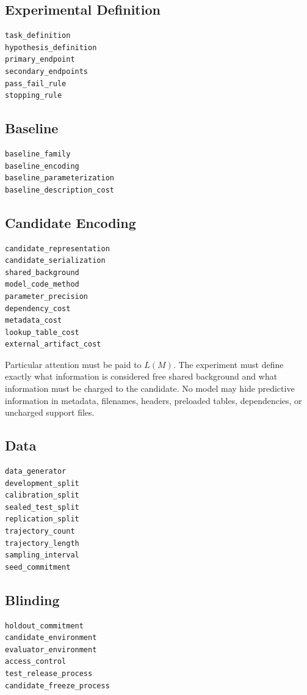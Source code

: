 \documentclass[11pt]{article}
\begin{document}
\subsection{Experimental Definition}
\begin{verbatim}
task_definition
hypothesis_definition
primary_endpoint
secondary_endpoints
pass_fail_rule
stopping_rule
\end{verbatim}

\subsection{Baseline}
\begin{verbatim}
baseline_family
baseline_encoding
baseline_parameterization
baseline_description_cost
\end{verbatim}

\subsection{Candidate Encoding}
\begin{verbatim}
candidate_representation
candidate_serialization
shared_background
model_code_method
parameter_precision
dependency_cost
metadata_cost
lookup_table_cost
external_artifact_cost
\end{verbatim}
Particular attention must be paid to \(L(M)\). The experiment must define exactly what information is considered free shared background and what information must be charged to the candidate. No model may hide predictive information in metadata, filenames, headers, preloaded tables, dependencies, or uncharged support files.

\subsection{Data}
\begin{verbatim}
data_generator
development_split
calibration_split
sealed_test_split
replication_split
trajectory_count
trajectory_length
sampling_interval
seed_commitment
\end{verbatim}

\subsection{Blinding}
\begin{verbatim}
holdout_commitment
candidate_environment
evaluator_environment
access_control
test_release_process
candidate_freeze_process
\end{verbatim}
\end{document}
